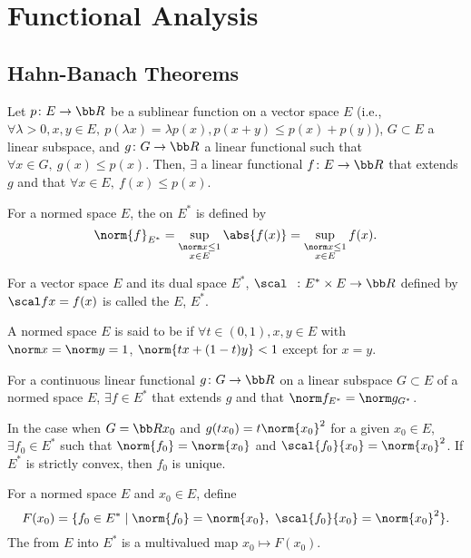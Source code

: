 \section{Functional Analysis}\cite{brezis}
\subsection{Hahn-Banach Theorems}
Let $p \colon E \to \bb R$ be a sublinear function on a vector space $E$ (i.e., $\forall \lambda > 0, x, y \in E,\ p(\lambda x) = \lambda p(x), p(x+y) \le p(x) + p(y)$), $G \subset E$ a linear subspace, and $g \colon G \to \bb R$ a linear functional such that $\forall x \in G,\ g(x) \le p(x)$. Then, $\exists$ a linear functional $f \colon E \to \bb R$ that extends $g$ and that $\forall x \in E,\ f(x) \le p(x)$.

For a normed space $E$, the  on $E^*$ is defined by
\[
  \norm{f}_{E^*} = \sup_{\substack{\norm x \le 1 \\ x \in E}} \abs{f(x)} = \sup_{\substack{\norm x \le 1 \\ x \in E}} f(x).
\]

For a vector space $E$ and its dual space $E^*$, $\scal\ \  \colon E^* \times E \to \bb R$ defined by $\scal fx = f(x)$ is called the  $E$, $E^*$.

A normed space $E$ is said to be  if $\forall t \in (0, 1), x, y \in E$ with $\norm x = \norm y = 1$, $\norm{tx + (1-t)y} < 1$ except for $x = y$.

For a continuous linear functional $g \colon G \to \bb R$ on a linear subspace $G \subset E$ of a normed space $E$, $\exists f \in E^*$ that extends $g$ and that $\norm f_{E^*} = \norm g_{G^*}$.

In the case when $G = \bb R x_0$ and $g(tx_0) = t \norm{x_0}^2$ for a given $x_0 \in E$, $\exists f_0 \in E^*$ such that $\norm{f_0} = \norm{x_0}$ and $\scal{f_0}{x_0} = \norm{x_0}^2$. If $E^*$ is strictly convex, then $f_0$ is unique.

For a normed space $E$ and $x_0 \in E$, define
\[
  F(x_0) = \{ f_0 \in E^* \mid \norm{f_0} = \norm{x_0},\ \scal{f_0}{x_0} = \norm{x_0}^2 \}.
\]
The  from $E$ into $E^*$ is a multivalued map $x_0 \mapsto F(x_0)$.

